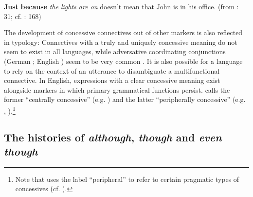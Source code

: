 \ea\label{ex:7}\label{bkm:Ref470803084}\textbf{Just} \textbf{because} \textit{the lights are on} doesn’t mean that John is in his office. (from \citealt{Hilpert2007}: 31; cf. \citealt{Hilpert2013a}: 168)
\z

The development of concessive connectives out of other markers is also reflected in typology: Connectives with a truly and uniquely concessive meaning do not seem to exist in all languages, while adversative coordinating conjunctions (German ; English ) seem to be very common \citep[632]{König1991b}. It is also possible for a language to rely on the context of an utterance to disambiguate a multifunctional connective. In English, expressions with a clear concessive meaning exist alongside markers in which primary grammatical functions persist. \citet[40]{Aarts1988} calls the former “centrally concessive” (e.g. ) and the latter “peripherally concessive” (e.g. , ).\footnote{Note that \citet[343–348]{DiMeola1998} uses the label “peripheral” to refer to certain pragmatic types of concessives (cf. ).}

\subsection{\label{bkm:Ref485723430}The histories of \textit{although}, \textit{though} and \textit{even though}}\label{sec:2.1.2}

